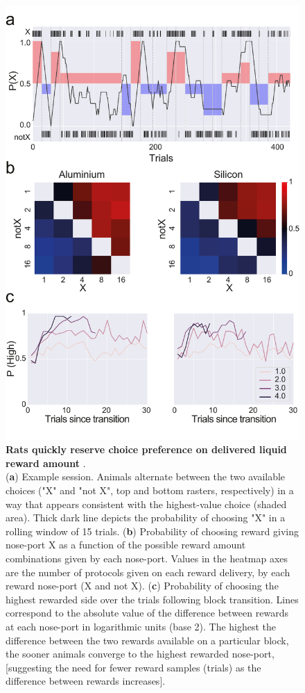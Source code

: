 \begin{figure}[ht] 
	\centering
	\includegraphics[width=1.0\linewidth]{Figures/Artboard 9.pdf}
	\caption{\textbf{Rats quickly reserve choice preference on delivered liquid reward amount }.\\
		(\textbf{a}) Example session. Animals alternate between the two available choices ("X" and "not X", top and bottom rasters, respectively) in a way that appears consistent with the highest-value choice (shaded area). Thick dark line depicts the probability of choosing "X" in a rolling window of 15 trials. (\textbf{b}) Probability of choosing reward giving nose-port X as a function of the possible reward amount combinations given by each nose-port. Values in the heatmap axes are the number of protocols given on each reward delivery, by each reward nose-port (X and not X). (\textbf{c}) Probability of choosing the highest rewarded side over the trials following block transition. Lines correspond to the absolute value of the difference between rewards at each nose-port in logarithmic units (base 2). The highest the difference between the two rewards available on a particular block, the sooner animals converge to the highest rewarded nose-port, [suggesting the need for fewer reward samples (trials) as the difference between rewards increases]. }
	\label{fig:Behavior} 
\end{figure}


